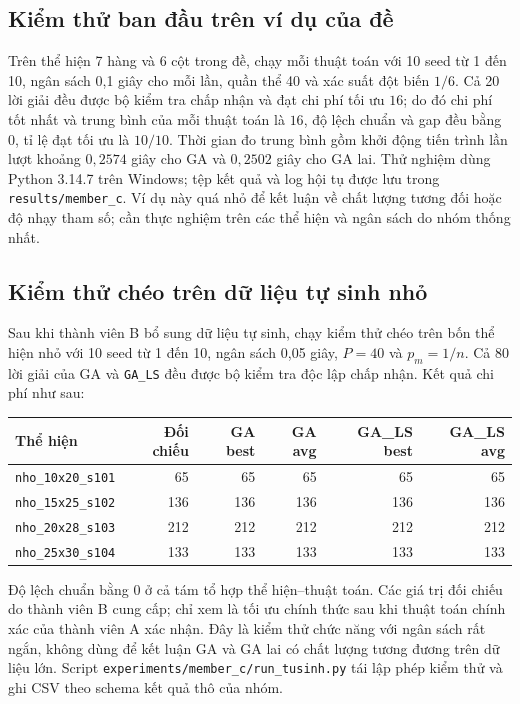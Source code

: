 \subsection{Kiểm thử ban đầu trên ví dụ của đề}
Trên thể hiện 7 hàng và 6 cột trong đề, chạy mỗi thuật toán với 10 seed từ 1 đến 10, ngân sách 0,1 giây cho mỗi lần, quần thể 40 và xác suất đột biến $1/6$. Cả 20 lời giải đều được bộ kiểm tra chấp nhận và đạt chi phí tối ưu $16$; do đó chi phí tốt nhất và trung bình của mỗi thuật toán là $16$, độ lệch chuẩn và gap đều bằng $0$, tỉ lệ đạt tối ưu là $10/10$. Thời gian đo trung bình gồm khởi động tiến trình lần lượt khoảng $0{,}2574$ giây cho GA và $0{,}2502$ giây cho GA lai. Thử nghiệm dùng Python 3.14.7 trên Windows; tệp kết quả và log hội tụ được lưu trong \texttt{results/member\_c}. Ví dụ này quá nhỏ để kết luận về chất lượng tương đối hoặc độ nhạy tham số; cần thực nghiệm trên các thể hiện và ngân sách do nhóm thống nhất.

\subsection{Kiểm thử chéo trên dữ liệu tự sinh nhỏ}
Sau khi thành viên B bổ sung dữ liệu tự sinh, chạy kiểm thử chéo trên bốn thể hiện nhỏ với 10 seed từ 1 đến 10, ngân sách 0,05 giây, $P=40$ và $p_m=1/n$. Cả 80 lời giải của GA và \texttt{GA\_LS} đều được bộ kiểm tra độc lập chấp nhận. Kết quả chi phí như sau:
\begin{center}
\begin{tabular}{lrrrrr}
\hline
Thể hiện & Đối chiếu & GA best & GA avg & GA\_LS best & GA\_LS avg \\
\hline
\texttt{nho\_10x20\_s101} & 65  & 65  & 65  & 65  & 65 \\
\texttt{nho\_15x25\_s102} & 136 & 136 & 136 & 136 & 136 \\
\texttt{nho\_20x28\_s103} & 212 & 212 & 212 & 212 & 212 \\
\texttt{nho\_25x30\_s104} & 133 & 133 & 133 & 133 & 133 \\
\hline
\end{tabular}
\end{center}
Độ lệch chuẩn bằng 0 ở cả tám tổ hợp thể hiện--thuật toán. Các giá trị đối chiếu do thành viên B cung cấp; chỉ xem là tối ưu chính thức sau khi thuật toán chính xác của thành viên A xác nhận. Đây là kiểm thử chức năng với ngân sách rất ngắn, không dùng để kết luận GA và GA lai có chất lượng tương đương trên dữ liệu lớn. Script \texttt{experiments/member\_c/run\_tusinh.py} tái lập phép kiểm thử và ghi CSV theo schema kết quả thô của nhóm.

